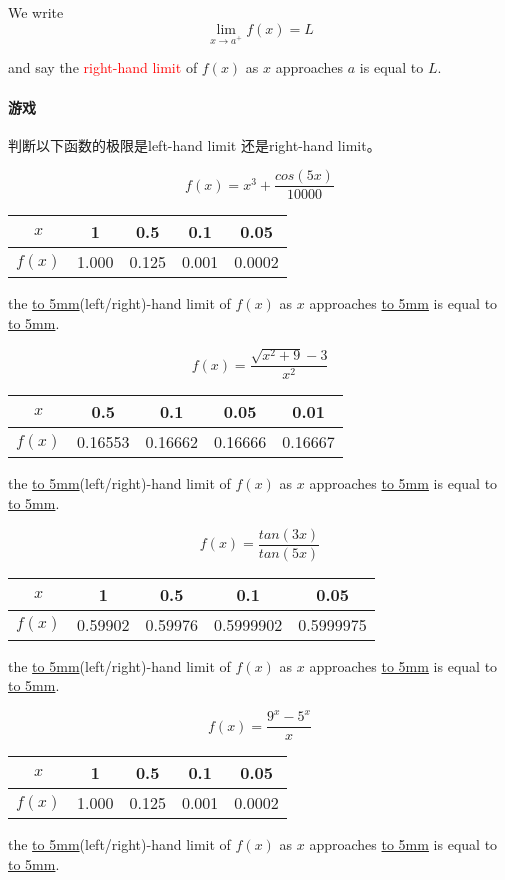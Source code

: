 \documentclass[UTF8]{ctexart}
\begin{document}
We write \[ {\lim_{x\to a^+ }} f(x) = L\]

and say the \textcolor{red}{right-hand limit} of $f(x)$ as $x$ approaches $a$ is equal to $L$.

\paragraph{游戏}
判断以下函数的极限是left-hand limit 还是right-hand limit。

\[f(x) = x^3 + \frac{cos(5x)}{10000}\]
\begin{center}
\begin{tabular}{c|c|c|c|c}
\hline
$x$  & 1 & 0.5 & 0.1& 0.05 \\
\hline
$f(x)$ & 1.000 & 0.125 & 0.001 & 0.0002\\
\hline
\end{tabular}
\end{center}
the \underline{\hbox to 5mm{}}(left/right)-hand limit of $f(x)$ as $x$ approaches \underline{\hbox to 5mm{}} is equal to \underline{\hbox to 5mm{}}.

\[f(x) = \frac{\sqrt{x^2+9}-3}{x^2}\]
\begin{center}
\begin{tabular}{c|c|c|c|c}
\hline
$x$  & 0.5 & 0.1 & 0.05& 0.01 \\
\hline
$f(x)$ & 0.16553 & 0.16662 & 0.16666 & 0.16667\\
\hline
\end{tabular}
\end{center}
the \underline{\hbox to 5mm{}}(left/right)-hand limit of $f(x)$ as $x$ approaches \underline{\hbox to 5mm{}} is equal to \underline{\hbox to 5mm{}}.

\[f(x) =\frac{tan(3x)}{tan(5x)}\]
\begin{center}
\begin{tabular}{c|c|c|c|c}
\hline
$x$  & 1 & 0.5 & 0.1& 0.05 \\
\hline
$f(x)$ & 0.59902 & 0.59976 & 0.5999902 & 0.5999975\\
\hline
\end{tabular}
\end{center}
the \underline{\hbox to 5mm{}}(left/right)-hand limit of $f(x)$ as $x$ approaches \underline{\hbox to 5mm{}} is equal to \underline{\hbox to 5mm{}}.

\[f(x) = \frac{9^x-5^x}{x}\]
\begin{center}
\begin{tabular}{c|c|c|c|c}
\hline
$x$  & 1 & 0.5 & 0.1& 0.05 \\
\hline
$f(x)$ & 1.000 & 0.125 & 0.001 & 0.0002\\
\hline
\end{tabular}
\end{center}
the \underline{\hbox to 5mm{}}(left/right)-hand limit of $f(x)$ as $x$ approaches \underline{\hbox to 5mm{}} is equal to \underline{\hbox to 5mm{}}.
\end{document}
